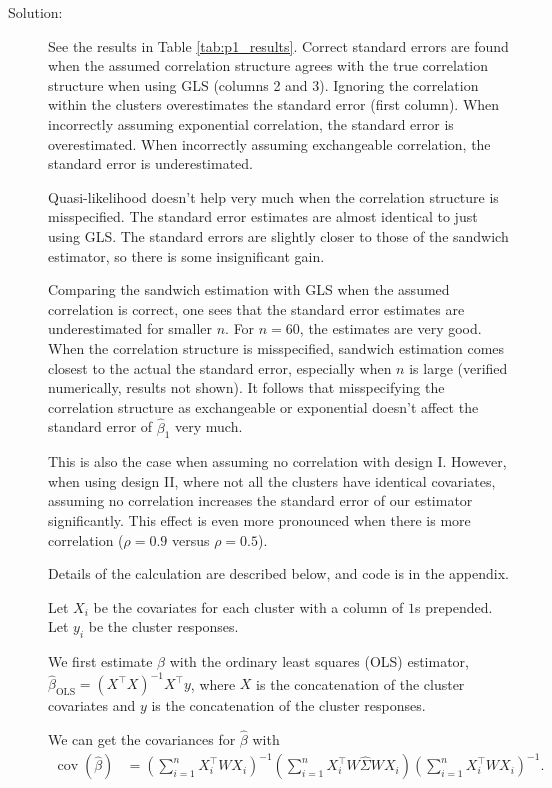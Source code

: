 \documentclass[11pt, letterpaper]{article}
\begin{document}
\begin{description}
\item[Solution:] See the results in Table \ref{tab:p1_results}. Correct standard
  errors are found when the assumed correlation structure agrees with the true
  correlation structure when using GLS (columns 2 and 3). Ignoring the
  correlation within the clusters overestimates the standard error (first
  column). When incorrectly assuming exponential correlation, the standard error
  is overestimated. When incorrectly assuming exchangeable correlation, the
  standard error is underestimated.

  Quasi-likelihood doesn't help very much when the correlation structure is
  misspecified. The standard error estimates are almost identical to just using
  GLS. The standard errors are slightly closer to those of the sandwich
  estimator, so there is some insignificant gain.

  Comparing the sandwich estimation with GLS when the assumed correlation is
  correct, one sees that the standard error estimates are underestimated for
  smaller $n$. For $n = 60$, the estimates are very good. When the correlation
  structure is misspecified, sandwich estimation comes closest to the actual the
  standard error, especially when $n$ is large (verified numerically, results
  not shown). It follows that misspecifying the correlation structure as
  exchangeable or exponential doesn't affect the standard error of
  $\hat{\beta}_1$ very much. 

  This is also the case when assuming no correlation with design I. However, when
  using design II, where not all the clusters have identical covariates,
  assuming no correlation increases the standard error of our estimator
  significantly. This effect is even more pronounced when there is more
  correlation ($\rho = 0.9$ versus $\rho = 0.5$).

  Details of the calculation are described below, and code is in the appendix.
    
  Let $X_i$ be the covariates for each cluster with a column of $1$s
  prepended. Let $y_i$ be the cluster responses.

  We first estimate $\beta$ with the ordinary least squares (OLS) estimator,
  $\hat{\beta}_{\mathrm{OLS}} = \left(X^\intercal X\right)^{-1}X^\intercal y$,
  where $X$ is the concatenation of the cluster covariates and $y$ is the
  concatenation of the cluster responses.
  
  We can get the covariances for $\hat{\beta}$ with
  \begin{align*}
    \operatorname{cov}\left(\hat{\beta}\right)
    &= \left(\sum_{i=1}^n X_i^\intercal W X_i\right)^{-1}
    \left(\sum_{i=1}^n X_i^\intercal W \hat{\Sigma} W X_i\right)
    \left(\sum_{i=1}^n X_i^\intercal W X_i\right)^{-1}.
  \end{align*}


\end{description}
\end{document}
